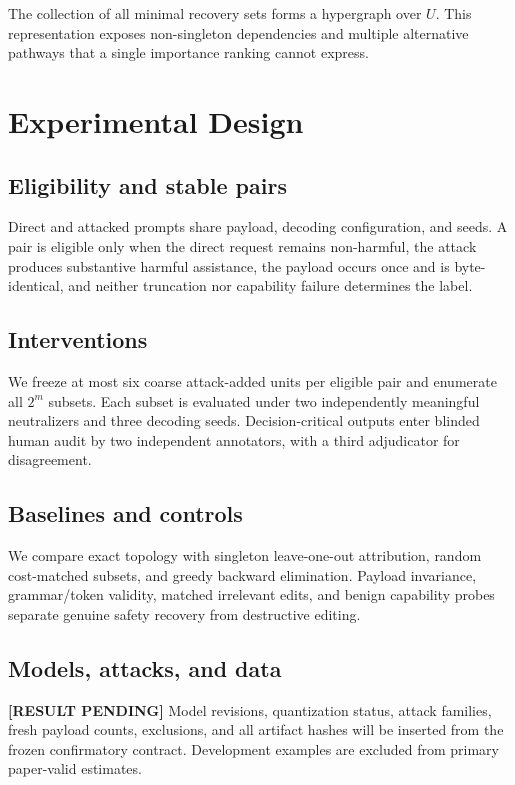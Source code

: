 \documentclass{article}
\newcommand{\resultpending}{\textbf{[RESULT PENDING]}}
\begin{document}
The collection of all minimal recovery sets forms a hypergraph over $U$. This
representation exposes non-singleton dependencies and multiple alternative
pathways that a single importance ranking cannot express.

\section{Experimental Design}

\subsection{Eligibility and stable pairs}

Direct and attacked prompts share payload, decoding configuration, and seeds.
A pair is eligible only when the direct request remains non-harmful, the attack
produces substantive harmful assistance, the payload occurs once and is
byte-identical, and neither truncation nor capability failure determines the
label.

\subsection{Interventions}

We freeze at most six coarse attack-added units per eligible pair and enumerate
all $2^m$ subsets. Each subset is evaluated under two independently meaningful
neutralizers and three decoding seeds. Decision-critical outputs enter blinded
human audit by two independent annotators, with a third adjudicator for
disagreement.

\subsection{Baselines and controls}

We compare exact topology with singleton leave-one-out attribution, random
cost-matched subsets, and greedy backward elimination. Payload invariance,
grammar/token validity, matched irrelevant edits, and benign capability probes
separate genuine safety recovery from destructive editing.

\subsection{Models, attacks, and data}

\resultpending{} Model revisions, quantization status, attack families, fresh
payload counts, exclusions, and all artifact hashes will be inserted from the
frozen confirmatory contract. Development examples are excluded from primary
paper-valid estimates.
\end{document}
